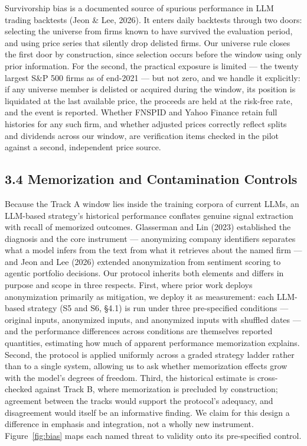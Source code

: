\documentclass[
  12pt,
]{article}
\begin{document}
Survivorship bias is a documented source of spurious performance in LLM
trading backtests (Jeon \& Lee, 2026). It enters daily backtests through
two doors: selecting the universe from firms known to have survived the
evaluation period, and using price series that silently drop delisted
firms. Our universe rule closes the first door by construction, since
selection occurs before the window using only prior information. For the
second, the practical exposure is limited --- the twenty largest S\&P
500 firms as of end-2021 --- but not zero, and we handle it explicitly:
if any universe member is delisted or acquired during the window, its
position is liquidated at the last available price, the proceeds are
held at the risk-free rate, and the event is reported. Whether FNSPID
and Yahoo Finance retain full histories for any such firm, and whether
adjusted prices correctly reflect splits and dividends across our
window, are verification items checked in the pilot against a second,
independent price source.

\hypertarget{memorization-and-contamination-controls}{%
\subsection{3.4 Memorization and Contamination
Controls}\label{memorization-and-contamination-controls}}

Because the Track A window lies inside the training corpora of current
LLMs, an LLM-based strategy's historical performance conflates genuine
signal extraction with recall of memorized outcomes. Glasserman and Lin
(2023) established the diagnosis and the core instrument --- anonymizing
company identifiers separates what a model infers from the text from
what it retrieves about the named firm --- and Jeon and Lee (2026)
extended anonymization from sentiment scoring to agentic portfolio
decisions. Our protocol inherits both elements and differs in purpose
and scope in three respects. First, where prior work deploys
anonymization primarily as mitigation, we deploy it as measurement: each
LLM-based strategy (S5 and S6, §4.1) is run under three pre-specified
conditions --- original inputs, anonymized inputs, and anonymized inputs
with shuffled dates --- and the performance differences across
conditions are themselves reported quantities, estimating how much of
apparent performance memorization explains. Second, the protocol is
applied uniformly across a graded strategy ladder rather than to a
single system, allowing us to ask whether memorization effects grow with
the model's degrees of freedom. Third, the historical estimate is
cross-checked against Track B, where memorization is precluded by
construction; agreement between the tracks would support the protocol's
adequacy, and disagreement would itself be an informative finding. We
claim for this design a difference in emphasis and integration, not a
wholly new instrument. Figure~\ref{fig:bias} maps each named threat to validity onto its pre-specified control.
\end{document}
